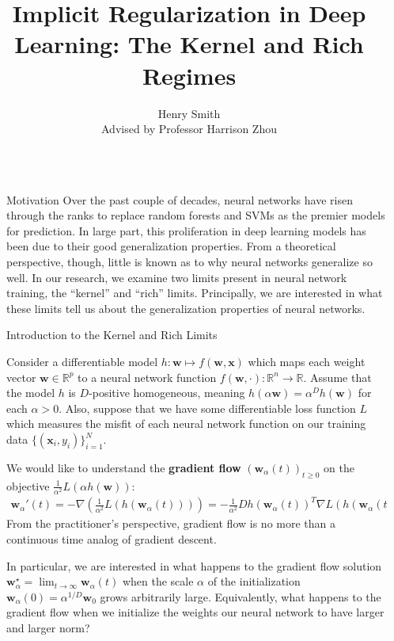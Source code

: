 \documentclass[final, 20pt]{beamer}
\title{Implicit Regularization in Deep Learning: The Kernel and Rich Regimes}
\author{Henry Smith\\Advised by Professor Harrison Zhou}
\institute[shortinst]{Yale University}
\newlength{\sepwidth}
\newlength{\colwidth}
\newcommand{\separatorcolumn}{\begin{column}{\sepwidth}\end{column}}
\begin{document}
\begin{frame}[t]
\begin{columns}[t]
\separatorcolumn

\begin{column}{\colwidth}
 
  \begin{block}{Motivation}
  Over the past couple of decades, neural networks have risen through the ranks to replace random forests and SVMs as the premier models for prediction. In large part, this proliferation in deep learning models has been due to their good generalization properties. From a theoretical perspective, though, little is known as to why neural networks generalize so well. In our research, we examine two limits present in neural network training, the \enquote{kernel} and \enquote{rich} limits. Principally, we are interested in what these limits tell us about the generalization properties of neural networks.
  \end{block}

  \begin{block}{Introduction to the Kernel and Rich Limits}

    Consider a differentiable model $h: \boldsymbol{w} \mapsto f(\boldsymbol{w}, \boldsymbol{x})$ which maps each weight vector $\boldsymbol{w} \in \mathbb{R}^p$ to a neural network function $f(\boldsymbol{w}, \cdot): \mathbb{R}^n \rightarrow \mathbb{R}$. Assume that the model $h$ is $D$-positive homogeneous, meaning $h(\alpha \boldsymbol{w}) = \alpha^D h(\boldsymbol{w})$ for each $\alpha > 0$. Also, suppose that we have some differentiable loss function $L$ which measures the misfit of each neural network function on our training data $\{ (\boldsymbol{x}_i, y_i) \}_{i=1}^N$.
    
    We would like to understand the \textbf{gradient flow} $(\boldsymbol{w}_{\alpha}(t))_{t \geq 0}$ on the objective $\frac{1}{\alpha^2}L(\alpha h(\boldsymbol{w}))$:
    \begin{align*}
    \boldsymbol{w}_{\alpha}'(t) = - \nabla\left( \frac{1}{\alpha^2}L(h(\boldsymbol{w}_{\alpha}(t))) \right) =  - \frac{1}{\alpha^2} Dh(\boldsymbol{w}_{\alpha}(t))^T \nabla L(h(\boldsymbol{w}_{\alpha}(t))), \quad \boldsymbol{w}_{\alpha}(0) = \alpha^{1/D}\boldsymbol{w}_0.
    \end{align*}
    From the practitioner's perspective, gradient flow is no more than a continuous time analog of gradient descent.
    
    In particular, we are interested in what happens to the gradient flow solution $\boldsymbol{w}_{\alpha}^{\star} = \lim_{t \to \infty} \boldsymbol{w}_{\alpha}(t)$ when the scale $\alpha$ of the initialization $\boldsymbol{w}_{\alpha}(0) = \alpha^{1/D}\boldsymbol{w}_0$ grows arbitrarily large. Equivalently, what happens to the gradient flow when we initialize the weights our neural network to have larger and larger norm?
    

\end{block}
\end{column}
\end{columns}
\end{frame}
\end{document}
